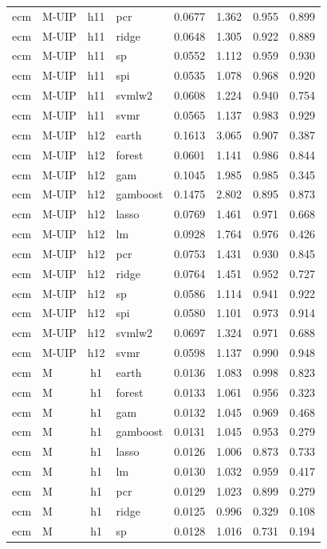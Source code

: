 \begin{ThreePartTable}
\begin{longtable}[t]{llclcccc}
ecm & M-UIP & h11 & pcr & 0.0677 & 1.362 & 0.955 & 0.899\\
ecm & M-UIP & h11 & ridge & 0.0648 & 1.305 & 0.922 & 0.889\\
ecm & M-UIP & h11 & sp & 0.0552 & 1.112 & 0.959 & 0.930\\
ecm & M-UIP & h11 & spi & 0.0535 & 1.078 & 0.968 & 0.920\\
ecm & M-UIP & h11 & svmlw2 & 0.0608 & 1.224 & 0.940 & 0.754\\
ecm & M-UIP & h11 & svmr & 0.0565 & 1.137 & 0.983 & 0.929\\
\addlinespace
ecm & M-UIP & h12 & earth & 0.1613 & 3.065 & 0.907 & 0.387\\
ecm & M-UIP & h12 & forest & 0.0601 & 1.141 & 0.986 & 0.844\\
ecm & M-UIP & h12 & gam & 0.1045 & 1.985 & 0.985 & 0.345\\
ecm & M-UIP & h12 & gamboost & 0.1475 & 2.802 & 0.895 & 0.873\\
ecm & M-UIP & h12 & lasso & 0.0769 & 1.461 & 0.971 & 0.668\\
ecm & M-UIP & h12 & lm & 0.0928 & 1.764 & 0.976 & 0.426\\
ecm & M-UIP & h12 & pcr & 0.0753 & 1.431 & 0.930 & 0.845\\
ecm & M-UIP & h12 & ridge & 0.0764 & 1.451 & 0.952 & 0.727\\
ecm & M-UIP & h12 & sp & 0.0586 & 1.114 & 0.941 & 0.922\\
ecm & M-UIP & h12 & spi & 0.0580 & 1.101 & 0.973 & 0.914\\
ecm & M-UIP & h12 & svmlw2 & 0.0697 & 1.324 & 0.971 & 0.688\\
ecm & M-UIP & h12 & svmr & 0.0598 & 1.137 & 0.990 & 0.948\\
\addlinespace
ecm & M & h1 & earth & 0.0136 & 1.083 & 0.998 & 0.823\\
ecm & M & h1 & forest & 0.0133 & 1.061 & 0.956 & 0.323\\
ecm & M & h1 & gam & 0.0132 & 1.045 & 0.969 & 0.468\\
ecm & M & h1 & gamboost & 0.0131 & 1.045 & 0.953 & 0.279\\
ecm & M & h1 & lasso & 0.0126 & 1.006 & 0.873 & 0.733\\
ecm & M & h1 & lm & 0.0130 & 1.032 & 0.959 & 0.417\\
ecm & M & h1 & pcr & 0.0129 & 1.023 & 0.899 & 0.279\\
ecm & M & h1 & ridge & 0.0125 & 0.996 & 0.329 & 0.108\\
ecm & M & h1 & sp & 0.0128 & 1.016 & 0.731 & 0.194\\

\end{longtable}
\end{ThreePartTable}
